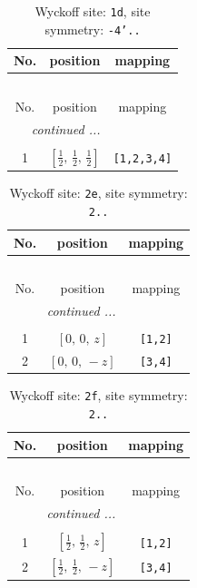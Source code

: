 \documentclass[fleqn,8pt]{jsarticle}
\begin{document}
\renewcommand{\arraystretch}{1.2}
\begin{longtable}{ccc}
\caption{Wyckoff site: {\tt 1d}, site symmetry: {\tt -4'..}}
 \\
 \hline \hline
No. & position & mapping \\ \hline \endfirsthead

\multicolumn{2}{l}{\tablename\ \thetable{}} \\
 \hline \hline
No. & position & mapping \\ \hline \endhead

 \hline \hline
\multicolumn{2}{r}{\footnotesize\it continued ...} \\ \endfoot

 \hline \hline
\multicolumn{2}{r}{} \\ \endlastfoot

1 & $\left[ \frac{1}{2},\, \frac{1}{2},\, \frac{1}{2} \right]$ & {\tt [1,2,3,4]} \\
\end{longtable}
\renewcommand{\arraystretch}{1.2}
\begin{longtable}{ccc}
\caption{Wyckoff site: {\tt 2e}, site symmetry: {\tt 2..}}
 \\
 \hline \hline
No. & position & mapping \\ \hline \endfirsthead

\multicolumn{2}{l}{\tablename\ \thetable{}} \\
 \hline \hline
No. & position & mapping \\ \hline \endhead

 \hline \hline
\multicolumn{2}{r}{\footnotesize\it continued ...} \\ \endfoot

 \hline \hline
\multicolumn{2}{r}{} \\ \endlastfoot

1 & $\left[ 0,\, 0,\, z \right]$ & {\tt [1,2]} \\ \hline
2 & $\left[ 0,\, 0,\, - z \right]$ & {\tt [3,4]} \\
\end{longtable}
\renewcommand{\arraystretch}{1.2}
\begin{longtable}{ccc}
\caption{Wyckoff site: {\tt 2f}, site symmetry: {\tt 2..}}
 \\
 \hline \hline
No. & position & mapping \\ \hline \endfirsthead

\multicolumn{2}{l}{\tablename\ \thetable{}} \\
 \hline \hline
No. & position & mapping \\ \hline \endhead

 \hline \hline
\multicolumn{2}{r}{\footnotesize\it continued ...} \\ \endfoot

 \hline \hline
\multicolumn{2}{r}{} \\ \endlastfoot

1 & $\left[ \frac{1}{2},\, \frac{1}{2},\, z \right]$ & {\tt [1,2]} \\ \hline
2 & $\left[ \frac{1}{2},\, \frac{1}{2},\, - z \right]$ & {\tt [3,4]} \\
\end{longtable}
\end{document}
